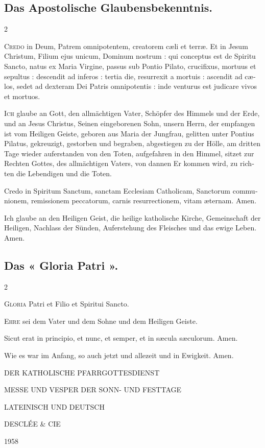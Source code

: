 \documentclass[14pt,a4paper]{extarticle}
\newcommand\chunks[2]{%
\begin{leftcolumn*}\begin{otherlanguage}{latin}%
\noindent\kern\parindent\ignorespaces#1%
\end{otherlanguage}\end{leftcolumn*}%
\begin{rightcolumn}\begin{otherlanguage}{german}%
\noindent\kern\parindent\ignorespaces#2%
\end{otherlanguage}\end{rightcolumn}%
}
\begin{document}
\subsection*{Das Apostolische Glaubensbekenntnis.}
\begin{paracol}{2}
\chunks{\textsc{Credo} in Deum, Patrem omnipotentem, creatorem cæli et terræ. Et in Jesum Christum, Filium ejus unicum, Dominum nostrum : qui conceptus est de Spiritu Sancto, natus ex Maria Virgine, passus sub Pontio Pilato, crucifixus, mortuus et sepultus : descendit ad inferos : tertia die, resurrexit a mortuis : ascendit ad cælos, sedet ad dexteram Dei Patris omnipotentis : inde venturus est judicare vivos et mortuos.}
       {\textsc{Ich} glaube an Gott, den allmächtigen Vater, Schöpfer des Himmels und der Erde, und an Jesus Christus, Seinen eingeborenen Sohn, unsern Herrn, der empfangen ist vom Heiligen Geiste, geboren aus Maria der Jungfrau, gelitten unter Pontius Pilatus, gekreuzigt, gestorben und begraben, abgestiegen zu der Hölle, am dritten Tage wieder auferstanden von den Toten, aufgefahren in den Himmel, sitzet zur Rechten Gottes, des allmächtigen Vaters, von dannen Er kommen wird, zu richten die Lebendigen und die Toten.}
\chunks{Credo in Spiritum Sanctum, sanctam Ecclesiam Catholicam, Sanctorum communionem, remissionem peccatorum, carnis resurrectionem, vitam æternam. Amen.}
       {Ich glaube an den Heiligen Geist, die heilige katholische Kirche, Gemeinschaft der Heiligen, Nachlass der Sünden, Auferstehung des Fleisches und das ewige Leben. Amen.}
\end{paracol}

\subsection*{Das « Gloria Patri ».}
\begin{paracol}{2}
\chunks{\textsc{Gloria} Patri et Filio et Spiritui Sancto.}
       {\textsc{Ehre} sei dem Vater und dem Sohne und dem Heiligen Geiste.}
\chunks{Sicut erat in principio, et nunc, et semper, et in sæcula sæculorum. Amen.}
       {Wie es war im Anfang, so auch jetzt und allezeit und in Ewigkeit. Amen.}
\end{paracol}

\vspace*{\fill}
\begin{flushright}\footnotesize
DER KATHOLISCHE PFARRGOTTESDIENST\par
MESSE UND VESPER DER SONN- UND FESTTAGE\par
LATEINISCH UND DEUTSCH\par
DESCLÉE \& CIE\par
1958
\end{flushright}
\end{document}
